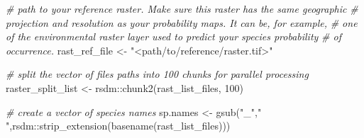 \documentclass[
]{article}
\newenvironment{Shaded}{\begin{snugshade}}{\end{snugshade}}
\newcommand{\CommentTok}[1]{\textcolor[rgb]{0.56,0.35,0.01}{\textit{#1}}}
\newcommand{\DecValTok}[1]{\textcolor[rgb]{0.00,0.00,0.81}{#1}}
\newcommand{\FunctionTok}[1]{\textcolor[rgb]{0.00,0.00,0.00}{#1}}
\newcommand{\NormalTok}[1]{#1}
\newcommand{\OtherTok}[1]{\textcolor[rgb]{0.56,0.35,0.01}{#1}}
\newcommand{\SpecialCharTok}[1]{\textcolor[rgb]{0.00,0.00,0.00}{#1}}
\newcommand{\StringTok}[1]{\textcolor[rgb]{0.31,0.60,0.02}{#1}}
\begin{document}
\begin{Shaded}
\begin{Highlighting}[]
\CommentTok{\# path to your reference raster. Make sure this raster has the same geographic }
\CommentTok{\# projection and resolution as your probability maps. It can be, for example, }
\CommentTok{\# one of the environmental raster layer used to predict your species probability}
\CommentTok{\# of occurrence.}
\NormalTok{rast\_ref\_file }\OtherTok{\textless{}{-}} \StringTok{"\textless{}path/to/reference/raster.tif\textgreater{}"} 

\CommentTok{\# split the vector of files paths into 100 chunks for parallel processing}
\NormalTok{raster\_split\_list }\OtherTok{\textless{}{-}}\NormalTok{ rsdm}\SpecialCharTok{::}\FunctionTok{chunk2}\NormalTok{(rast\_list\_files, }\DecValTok{100}\NormalTok{)}

\CommentTok{\# create a vector of species names}
\NormalTok{sp.names }\OtherTok{\textless{}{-}} \FunctionTok{gsub}\NormalTok{(}\StringTok{"\_"}\NormalTok{,}\StringTok{" "}\NormalTok{,rsdm}\SpecialCharTok{::}\FunctionTok{strip\_extension}\NormalTok{(}\FunctionTok{basename}\NormalTok{(rast\_list\_files)))}


\end{Highlighting}
\end{Shaded}
\end{document}
